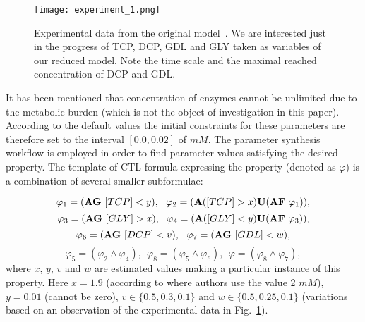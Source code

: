 \documentclass{llncs}
\begin{document}
\begin{figure}
\center
\texttt{[image: experiment\_1.png]}
\caption{Experimental data from the original model~\cite{kurumbang2013computer}. We are interested just in the progress of TCP, DCP, GDL and GLY taken as variables of our reduced model. Note the time scale and the maximal reached concentration of DCP and GDL.
}
\label{fig:simulation-default}
\end{figure}

It has been mentioned that concentration of enzymes cannot be unlimited due to the metabolic burden (which is not the object of investigation in this paper). According to the default values 
the initial constraints for these parameters are therefore set to the interval $[0.0,0.02]$ of $mM$. The parameter synthesis workflow is employed in order to find parameter values satisfying the desired property. 
The template of CTL formula expressing the property (denoted as $\varphi$) %
is a combination of several smaller subformulae:


{\scriptsize $$\varphi_1 = ({\bf AG}\ [TCP]<y), \ \ \varphi_2 = ({\bf A}([TCP]>x){\bf U}({\bf AF}\ \varphi_1)),$$
$$\varphi_3 = ({\bf AG}\ [GLY]>x), \ \ \varphi_4 = ({\bf A}([GLY]<y){\bf U}({\bf AF}\ \varphi_3)),$$
$$\varphi_6 = ({\bf AG}\ [DCP]<v), \ \ \varphi_7 = ({\bf AG}\ [GDL]<w),$$
$$\varphi_5= (\varphi_2 \land \varphi_4),\ \ \varphi_8 = (\varphi_5 \land \varphi_6), \ \ \varphi = (\varphi_8 \land \varphi_7),$$}%
where $x$, $y$, $v$ and $w$ are estimated values making a particular instance of this property. 
Here %
$x=1.9$ (according to \cite{kurumbang2013computer} where authors use the value 2 $mM$), $y=0.01$ (cannot be zero), $v\in\{0.5,0.3,0.1\}$ and $w\in\{0.5,0.25,0.1\}$ (variations based on an observation of the experimental data in Fig.~\ref{fig:simulation-default}).
\end{document}
